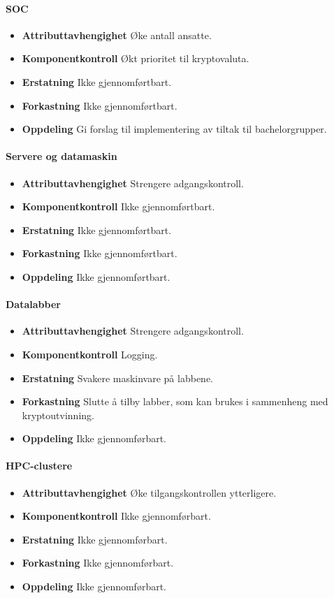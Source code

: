 \paragraph{SOC}
\begin{itemize}
    \item \textbf{Attributtavhengighet} Øke antall ansatte.
    \item \textbf{Komponentkontroll} Økt prioritet til kryptovaluta.
    \item \textbf{Erstatning} Ikke gjennomførtbart.
    \item \textbf{Forkastning} Ikke gjennomførtbart.
    \item \textbf{Oppdeling} Gi forslag til implementering av tiltak til bachelorgrupper.
\end{itemize}

\paragraph{Servere og datamaskin}
\begin{itemize}
    \item \textbf{Attributtavhengighet} Strengere adgangskontroll.
    \item \textbf{Komponentkontroll} Ikke gjennomførtbart.
    \item \textbf{Erstatning} Ikke gjennomførtbart.
    \item \textbf{Forkastning} Ikke gjennomførtbart.
    \item \textbf{Oppdeling} Ikke gjennomførtbart.
\end{itemize}

\paragraph{Datalabber}
\begin{itemize}
    \item \textbf{Attributtavhengighet} Strengere adgangskontroll.
    \item \textbf{Komponentkontroll} Logging.
    \item \textbf{Erstatning} Svakere maskinvare på labbene.
    \item \textbf{Forkastning} Slutte å tilby labber, som kan brukes i sammenheng med kryptoutvinning.
    \item \textbf{Oppdeling} Ikke gjennomførbart.
\end{itemize}

\paragraph{HPC-clustere}
\begin{itemize}
    \item \textbf{Attributtavhengighet} Øke tilgangskontrollen ytterligere.
    \item \textbf{Komponentkontroll} Ikke gjennomførbart.
    \item \textbf{Erstatning} Ikke gjennomførbart.
    \item \textbf{Forkastning} Ikke gjennomførbart.
    \item \textbf{Oppdeling} Ikke gjennomførbart.
\end{itemize}


